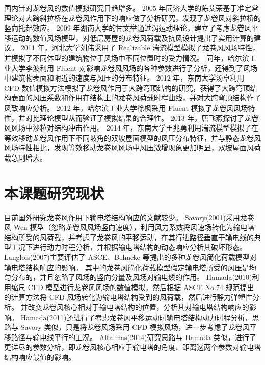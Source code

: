 国内针对龙卷风的数值模拟研究日趋增多。
2005 年同济大学的陈艾荣\cite{chen2004large}基于准定常理论对大跨斜拉桥在龙卷风作用下的响应做了分析研究，发现了龙卷风对斜拉桥的竖向托起效应。
2009 年湖南大学的甘文举\cite{gan2009low}通过涡运动理论，建立了考虑龙卷风平移运动的数值风场模型，对低层房屋的龙卷风荷载及抗风设计提出了实用计算的建议。
2011 年，河北大学刘伟\cite{liu2011lou}采用了 Realizable 湍流模型模拟了龙卷风风场特性，并模拟了不同体型的建筑物位于风场中不同位置时的受力情况。
同年，哈尔滨工业大学李波利用 Fluent 对影响龙卷风风场的各种参数进行了分析，还得到了风场中建筑物表面和附近的速度与风压的分布特征。
2012 年，东南大学汤卓\cite{tang2012tornado}利用 CFD 数值模拟方法模拟了龙卷风作用于大跨穹顶结构的研究，获得了大跨穹顶结构表面的风压系数和作用在结构上的龙卷风荷载时程曲线，并对大跨穹顶结构作了风致响应分析。
2012 年，哈尔滨工业大学徐枫\cite{xu2013tornado}采用 Fluent 模拟了龙卷风风场特性，并对比理论模型从而验证了模拟结果的合理性。
2013 年，唐飞燕\cite{tang2013tornado}探讨了龙卷风风场中沙粒对结构冲击作用。
2014 年，东南大学王兆勇\cite{wang2015different}利用湍流模型模拟了在等效移动龙卷风作用下不同坡角的双坡屋面模型的风压分布特征，并与静态龙卷风风场特性相比，发现等效移动龙卷风风场中风压激增现象更加明显，双坡屋面风荷载急剧增大。

\section{本课题研究现状}
目前国外研究龙卷风作用下输电塔结构响应的文献较少。
Savory(2001)\cite{savory2001modelling}采用龙卷风 Wen 模型（忽略龙卷风风场竖向速度），利用风力系数将风速场转化为输电塔结构所受的风荷载，并考虑了龙卷风的平移运动，在其行进路径垂直于输电线的典型工况下进行动力时程分析，并根据输电塔结构的动态响应分析其破坏形态。
Langlois(2007)\cite{langlois2007design}主要评估了 ASCE、Behncke 等提出的多种龙卷风简化荷载模型对输电塔结构响应的影响。
其中的龙卷风简化荷载模型假定输电塔所受的风压是均匀分布的，并且忽略了风场的竖向分量及风场对输电线的作用。
Hamada(2010)\cite{hamada2010finite}利用缩尺 CFD 模型进行龙卷风风场的数值模拟，然后根据 ASCE No.74 规范提出的计算方法将 CFD 风场转化为输电塔结构受到的风荷载，然后进行静力弹塑性分析。
并改变龙卷风核心相对于输电塔结构的位置，分析其对输电塔结构响应的影响。
Hamada(2011)还进行了考虑龙卷风平移运动时输电塔结构动力时程分析，思路与 Savory 类似，只是将龙卷风场采用 CFD 模拟风场，进一步考虑了龙卷风平移路径与输电线平行的工况。
Altalmas(2014)\cite{altalmas2014finite}研究思路与 Hamada 类似，进行了更详尽的参数分析，即龙卷风核心相应于输电塔的角度、距离这两个参数对输电塔结构响应最值的影响。


